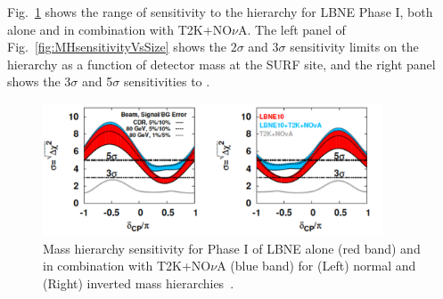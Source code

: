Fig.~\ref{fig:SMMH} shows the range of sensitivity to the hierarchy for LBNE Phase I, both alone and in combination with T2K+NO$\nu$A.  
The left panel of Fig.~\ref{fig:MHsensitivityVsSize} shows the $2\sigma$ and $3\sigma$ sensitivity limits on the hierarchy as a function of  detector mass at the SURF site, and the right panel shows the 3$\sigma$ and 5$\sigma$ sensitivities to \deltacp.  

\begin{figure}[htbp]
\begin{center}
\includegraphics[width=0.9\textwidth]{RWK/LBNE/SMMH.pdf}
\caption{Mass hierarchy sensitivity for Phase I of LBNE alone (red band) and in combination with T2K+NO$\nu$A (blue band) for (Left) normal and (Right) inverted mass hierarchies~\cite{lbne:sm}.}
\label{fig:SMMH}
\end{center}
\end{figure}

